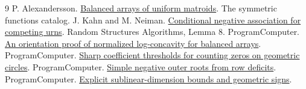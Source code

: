 \documentclass[11pt]{article}
\begin{document}
\small
\begin{thebibliography}{9}
 P. Alexandersson. \href{https://www.symmetricfunctions.com/realRootedOpenProblems.htm\#conjBalancedArrays}{Balanced arrays of uniform matroids}. The symmetric functions catalog.
 J. Kahn and M. Neiman. \href{https://doi.org/10.1002/rsa.20395}{Conditional negative association for competing urns}. Random Structures Algorithms, Lemma 8.
 ProgramComputer. \href{https://github.com/ProgramComputer/open-math-research/blob/14a7c082563830be7b42e5353c2269944a4260b5/topics/balanced-arrays/orientation-normalization.md}{An orientation proof of normalized log-concavity for balanced arrays}.
 ProgramComputer. \href{https://github.com/ProgramComputer/open-math-research/pull/175}{Sharp coefficient thresholds for counting zeros on geometric circles}.
 ProgramComputer. \href{https://github.com/ProgramComputer/open-math-research/pull/173}{Simple negative outer roots from row deficits}.
 ProgramComputer. \href{https://github.com/ProgramComputer/open-math-research/pull/148}{Explicit sublinear-dimension bounds and geometric signs}.
\end{thebibliography}
\end{document}
